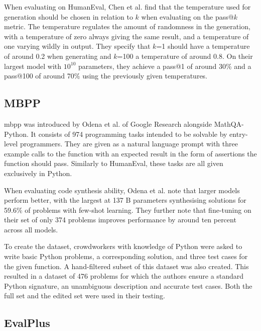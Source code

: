 When evaluating on HumanEval, Chen et al. find that the temperature used for generation should be chosen in relation to $k$ when evaluating on the pass@$k$ metric.
The temperature regulates the amount of randomness in the generation, with a temperature of zero always giving the same result, and a temperature of one varying wildly in output.
They specify that $k$=1 should have a temperature of around 0.2 when generating and $k$=100 a temperature of around 0.8.
On their largest model with $10^{10}$ parameters, they achieve a pass@1 of around 30\% and a pass@100 of around 70\% using the previously given temperatures.

\subsection{MBPP}
\label{sec:mbpp}
\ac{mbpp} was introduced by Odena et al. of Google Research \cite{Odena.2021} alongside MathQA-Python.
It consists of 974 programming tasks intended to be solvable by entry-level programmers.
They are given as a natural language prompt with three example calls to the function with an expected result in the form of assertions the function should pass.
Similarly to HumanEval, these tasks are all given exclusively in Python.

When evaluating code synthesis ability, Odena et al. note that larger models perform better, with the largest at 137 B parameters synthesising solutions for 59.6\% of problems with few-shot learning.
They further note that fine-tuning on their set of only 374 problems improves performance by around ten percent across all models.

To create the dataset, crowdworkers with knowledge of Python were asked to write basic Python problems, a corresponding solution, and three test cases for the given function.
A hand-filtered subset of this dataset was also created.
This resulted in a dataset of 476 problems for which the authors ensure a standard Python signature, an unambiguous description and accurate test cases.
Both the full set and the edited set were used in their testing.


\subsection{EvalPlus}
\label{sec:evalplus}

